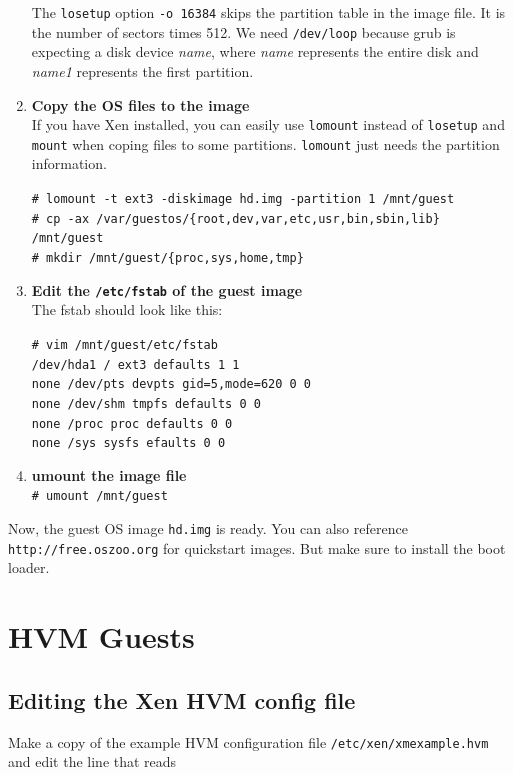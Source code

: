 \documentclass[11pt,twoside,final,openright]{report}
\begin{document}
\begin{enumerate}
The {\small {\tt losetup}} option {\small {\tt -o 16384}} skips the partition table in the image file. It is the number of sectors times 512. We need {\small {\tt /dev/loop}} because grub is expecting a disk device \emph{name}, where \emph{name} represents the entire disk and \emph{name1} represents the first partition.

\item {\bfseries Copy the OS files to the image}\\ 
If you have Xen installed, you can easily use {\small {\tt lomount}} instead of {\small {\tt losetup}} and {\small {\tt mount}} when coping files to some partitions. {\small {\tt lomount}} just needs the partition information.

{\scriptsize {\tt \# lomount -t ext3 -diskimage hd.img -partition 1 /mnt/guest\\
\# cp -ax /var/guestos/\{root,dev,var,etc,usr,bin,sbin,lib\} /mnt/guest\\
\# mkdir /mnt/guest/\{proc,sys,home,tmp\}}}

\item {\bfseries Edit the {\small {\tt /etc/fstab}} of the guest image}\\
The fstab should look like this:

{\scriptsize {\tt \# vim /mnt/guest/etc/fstab\\
/dev/hda1       /               ext3            defaults 1 1\\
none            /dev/pts        devpts  gid=5,mode=620 0 0\\
none            /dev/shm        tmpfs           defaults 0 0\\
none            /proc           proc            defaults 0 0\\
none            /sys            sysfs           efaults 0 0}}

\item {\bfseries umount the image file}\\
{\small {\tt \# umount /mnt/guest}}
\end{enumerate}

Now, the guest OS image {\small {\tt hd.img}} is ready. You can also reference {\small {\tt http://free.oszoo.org}} for quickstart images. But make sure to install the boot loader.

\section{HVM Guests}
\subsection{Editing the Xen HVM config file}
Make a copy of the example HVM configuration file {\small {\tt /etc/xen/xmexample.hvm}} and edit the line that reads
\end{document}
